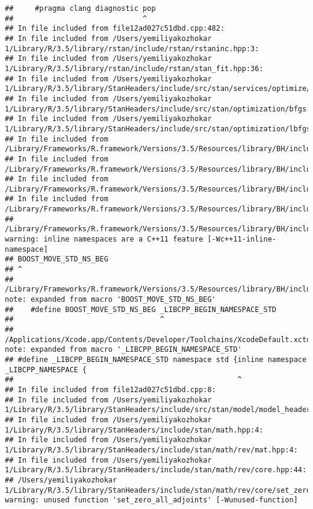 \documentclass[]{article}
\begin{document}
\begin{verbatim}
##     #pragma clang diagnostic pop
##                              ^
## In file included from file12ad027c51dbd.cpp:482:
## In file included from /Users/yemiliyakozhokar 1/Library/R/3.5/library/rstan/include/rstan/rstaninc.hpp:3:
## In file included from /Users/yemiliyakozhokar 1/Library/R/3.5/library/rstan/include/rstan/stan_fit.hpp:36:
## In file included from /Users/yemiliyakozhokar 1/Library/R/3.5/library/StanHeaders/include/src/stan/services/optimize/bfgs.hpp:11:
## In file included from /Users/yemiliyakozhokar 1/Library/R/3.5/library/StanHeaders/include/src/stan/optimization/bfgs.hpp:9:
## In file included from /Users/yemiliyakozhokar 1/Library/R/3.5/library/StanHeaders/include/src/stan/optimization/lbfgs_update.hpp:6:
## In file included from /Library/Frameworks/R.framework/Versions/3.5/Resources/library/BH/include/boost/circular_buffer.hpp:54:
## In file included from /Library/Frameworks/R.framework/Versions/3.5/Resources/library/BH/include/boost/circular_buffer/details.hpp:20:
## In file included from /Library/Frameworks/R.framework/Versions/3.5/Resources/library/BH/include/boost/move/move.hpp:30:
## In file included from /Library/Frameworks/R.framework/Versions/3.5/Resources/library/BH/include/boost/move/iterator.hpp:27:
## /Library/Frameworks/R.framework/Versions/3.5/Resources/library/BH/include/boost/move/detail/iterator_traits.hpp:29:1: warning: inline namespaces are a C++11 feature [-Wc++11-inline-namespace]
## BOOST_MOVE_STD_NS_BEG
## ^
## /Library/Frameworks/R.framework/Versions/3.5/Resources/library/BH/include/boost/move/detail/std_ns_begin.hpp:18:34: note: expanded from macro 'BOOST_MOVE_STD_NS_BEG'
##    #define BOOST_MOVE_STD_NS_BEG _LIBCPP_BEGIN_NAMESPACE_STD
##                                  ^
## /Applications/Xcode.app/Contents/Developer/Toolchains/XcodeDefault.xctoolchain/usr/include/c++/v1/__config:390:52: note: expanded from macro '_LIBCPP_BEGIN_NAMESPACE_STD'
## #define _LIBCPP_BEGIN_NAMESPACE_STD namespace std {inline namespace _LIBCPP_NAMESPACE {
##                                                    ^
## In file included from file12ad027c51dbd.cpp:8:
## In file included from /Users/yemiliyakozhokar 1/Library/R/3.5/library/StanHeaders/include/src/stan/model/model_header.hpp:4:
## In file included from /Users/yemiliyakozhokar 1/Library/R/3.5/library/StanHeaders/include/stan/math.hpp:4:
## In file included from /Users/yemiliyakozhokar 1/Library/R/3.5/library/StanHeaders/include/stan/math/rev/mat.hpp:4:
## In file included from /Users/yemiliyakozhokar 1/Library/R/3.5/library/StanHeaders/include/stan/math/rev/core.hpp:44:
## /Users/yemiliyakozhokar 1/Library/R/3.5/library/StanHeaders/include/stan/math/rev/core/set_zero_all_adjoints.hpp:14:17: warning: unused function 'set_zero_all_adjoints' [-Wunused-function]

\end{verbatim}
\end{document}

